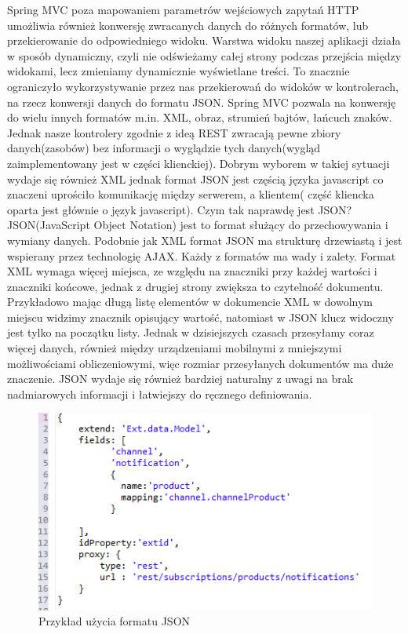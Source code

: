 Spring MVC poza mapowaniem parametrów wejściowych zapytań HTTP umożliwia również konwersję zwracanych danych do różnych formatów, lub przekierowanie do odpowiedniego widoku. Warstwa widoku naszej aplikacji działa w sposób dynamiczny, czyli nie odświeżamy całej strony podczas przejścia między widokami, lecz zmieniamy dynamicznie wyświetlane treści. To znacznie ograniczyło wykorzystywanie przez nas przekierowań do widoków w kontrolerach, na rzecz konwersji danych do formatu JSON. Spring MVC pozwala na konwersję do wielu innych formatów m.in. XML, obraz, strumień bajtów, łańcuch znaków. Jednak nasze kontrolery zgodnie z ideą REST zwracają pewne zbiory danych(zasobów) bez informacji o wyglądzie tych danych(wygląd zaimplementowany jest w części klienckiej). Dobrym wyborem w takiej sytuacji wydaje się również XML jednak format JSON jest częścią języka javascript co znaczeni uprościło komunikację między serwerem, a klientem( część kliencka oparta jest głównie o język javascript).
Czym tak naprawdę jest JSON? JSON(JavaScript Object Notation) jest to format służący do przechowywania i wymiany danych. Podobnie jak XML format JSON ma strukturę drzewiastą i jest wspierany przez technologię AJAX. Każdy z formatów ma wady i zalety. Format XML wymaga więcej miejsca, ze względu na znaczniki przy każdej wartości i znaczniki końcowe, jednak z drugiej strony zwiększa to czytelność dokumentu. Przykładowo mając długą listę elementów w dokumencie XML w dowolnym miejscu widzimy znacznik opisujący wartość, natomiast w JSON klucz widoczny jest tylko na początku listy. Jednak w dzisiejszych czasach przesyłamy coraz więcej danych, również między urządzeniami mobilnymi z mniejszymi możliwościami obliczeniowymi, więc rozmiar przesyłanych dokumentów ma duże znaczenie. JSON wydaje się również bardziej naturalny z uwagi na brak nadmiarowych informacji i łatwiejszy do ręcznego definiowania. 

\begin{figure}[H]
	\centering
	\includegraphics{images/json.png}
	\caption{Przykład użycia formatu JSON}
\end{figure}

